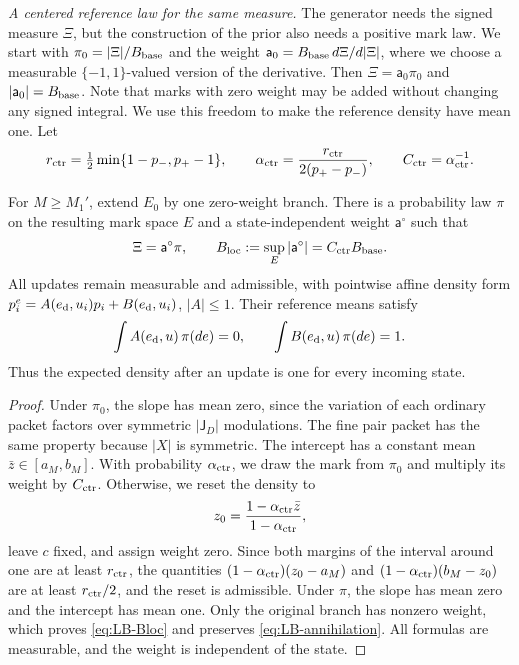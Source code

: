 \medskip\noindent\emph{A centered reference law for the same measure.}
The generator needs the signed measure $\Xi$, but the construction of
the prior also needs a positive mark law. We start with
$\pi_0=|\Xi|/B_{\rm base}$ and the weight
$\mathsf a_0=B_{\rm base}\,d\Xi/d|\Xi|$, where we choose a measurable
$\{-1,1\}$-valued version of the derivative. Then
$\Xi=\mathsf a_0\pi_0$ and $|\mathsf a_0|=B_{\rm base}$. Note that marks
with zero weight may be added without changing any signed integral. We use
this freedom to make the reference density have mean one. Let
\begin{equation}\label{eq:LB-centering-constants}
 r_{\rm ctr}=\tfrac12\min\{1-p_-,p_+-1\},\qquad
 \alpha_{\rm ctr}=\frac{r_{\rm ctr}}{2(p_+-p_-)},\qquad
 C_{\rm ctr}=\alpha_{\rm ctr}^{-1}.
\end{equation}

\begin{lemma}\label{lem:centered-row}
For $M\ge M_1'$, extend $E_0$ by one zero-weight branch.
There is a probability law $\pi$ on the resulting mark space $E$
and a state-independent weight $\mathsf a^\circ$ such that
\begin{equation}\label{eq:LB-Bloc}
 \Xi=\mathsf a^\circ\pi,\qquad
 B_{\rm loc}:=\sup_E|\mathsf a^\circ|=C_{\rm ctr}B_{\rm base}.
\end{equation}
All updates remain measurable and admissible, with pointwise affine
density form $p_i^e=A(e_{\rm d},u_i)p_i+B(e_{\rm d},u_i)$, $|A|\le1$.
Their reference means satisfy
\begin{equation}\label{eq:LB-row-centered}
 \int A(e_{\rm d},u)\,\pi(de)=0,\qquad
 \int B(e_{\rm d},u)\,\pi(de)=1.
\end{equation}
Thus the expected density after an update is one for every incoming state.
\end{lemma}

\begin{proof}
Under $\pi_0$, the slope has mean zero, since the variation of each
ordinary packet factors over symmetric $|\mathsf J_D|$ modulations. The
fine pair packet has the same property because $|X|$ is symmetric. The
intercept has a constant mean $\bar z\in[a_M,b_M]$. With probability
$\alpha_{\rm ctr}$, we draw the mark from $\pi_0$ and multiply its
weight by
$C_{\rm ctr}$. Otherwise, we reset the density to
\[
 z_0=\frac{1-\alpha_{\rm ctr}\bar z}{1-\alpha_{\rm ctr}},
\]
leave $c$ fixed, and assign weight zero. Since both margins of the
interval around one are at least $r_{\rm ctr}$, the quantities
$(1-\alpha_{\rm ctr})(z_0-a_M)$ and
$(1-\alpha_{\rm ctr})(b_M-z_0)$ are at least $r_{\rm ctr}/2$, and the
reset is admissible. Under $\pi$, the slope has mean zero and the
intercept has mean one. Only the original branch has nonzero weight,
which proves \eqref{eq:LB-Bloc} and preserves \eqref{eq:LB-annihilation}.
All formulas are measurable, and the weight is independent of the
state.
\end{proof}

